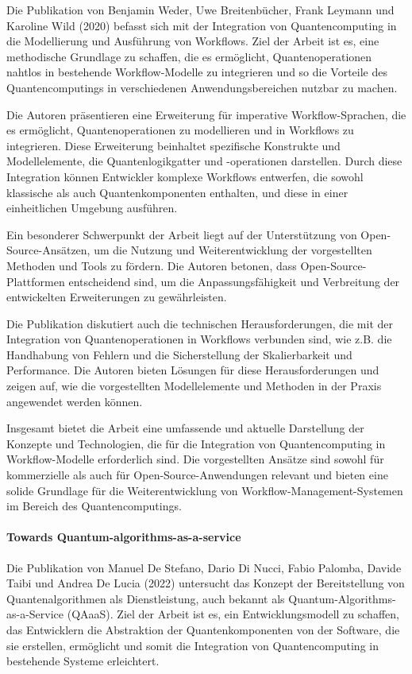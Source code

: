 Die Publikation von Benjamin Weder, Uwe Breitenbücher, Frank Leymann und Karoline Wild (2020) befasst sich mit der 
Integration von Quantencomputing in die Modellierung und Ausführung von Workflows. Ziel der Arbeit ist es, eine 
methodische Grundlage zu schaffen, die es ermöglicht, Quantenoperationen nahtlos in bestehende Workflow-Modelle zu 
integrieren und so die Vorteile des Quantencomputings in verschiedenen Anwendungsbereichen nutzbar zu machen.

Die Autoren präsentieren eine Erweiterung für imperative Workflow-Sprachen, die es ermöglicht, Quantenoperationen 
zu modellieren und in Workflows zu integrieren. Diese Erweiterung beinhaltet spezifische Konstrukte und Modellelemente, 
die Quantenlogikgatter und -operationen darstellen. Durch diese Integration können Entwickler komplexe Workflows entwerfen, 
die sowohl klassische als auch Quantenkomponenten enthalten, und diese in einer einheitlichen Umgebung ausführen.

Ein besonderer Schwerpunkt der Arbeit liegt auf der Unterstützung von Open-Source-Ansätzen, um die Nutzung und 
Weiterentwicklung der vorgestellten Methoden und Tools zu fördern. Die Autoren betonen, dass Open-Source-Plattformen 
entscheidend sind, um die Anpassungsfähigkeit und Verbreitung der entwickelten Erweiterungen zu gewährleisten.

Die Publikation diskutiert auch die technischen Herausforderungen, die mit der Integration von Quantenoperationen in 
Workflows verbunden sind, wie z.B. die Handhabung von Fehlern und die Sicherstellung der Skalierbarkeit und Performance. 
Die Autoren bieten Lösungen für diese Herausforderungen und zeigen auf, wie die vorgestellten Modellelemente und Methoden 
in der Praxis angewendet werden können.

Insgesamt bietet die Arbeit eine umfassende und aktuelle Darstellung der Konzepte und Technologien, die für die Integration 
von Quantencomputing in Workflow-Modelle erforderlich sind. Die vorgestellten Ansätze sind sowohl für kommerzielle als auch 
für Open-Source-Anwendungen relevant und bieten eine solide Grundlage für die Weiterentwicklung von Workflow-Management-Systemen 
im Bereich des Quantencomputings.

\paragraph{Towards Quantum-algorithms-as-a-service}

Die Publikation von Manuel De Stefano, Dario Di Nucci, Fabio Palomba, Davide Taibi und Andrea De Lucia (2022) untersucht 
das Konzept der Bereitstellung von Quantenalgorithmen als Dienstleistung, auch bekannt als Quantum-Algorithms-as-a-Service (QAaaS). 
Ziel der Arbeit ist es, ein Entwicklungsmodell zu schaffen, das Entwicklern die Abstraktion der Quantenkomponenten von der 
Software, die sie erstellen, ermöglicht und somit die Integration von Quantencomputing in bestehende Systeme erleichtert.


